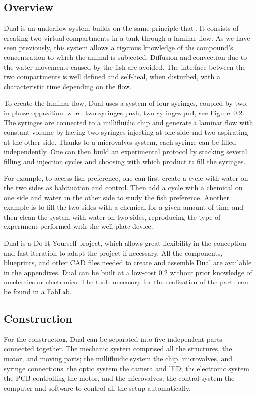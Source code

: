   \subsection{Overview}
  Dual is an underflow system builds on the same principle that \cite{readman2013fish}. It consists of creating two virtual compartments in a tank through a laminar flow. As we have seen previously, this system allows a rigorous knowledge of the compound's concentration to which the animal is subjected. Diffusion and convection due to the water movements caused by the fish are avoided. The interface between the two compartments is well defined and self-heal, when disturbed, with a characteristic time depending on the flow.

  To create the laminar flow, Dual uses a system of four syringes, coupled by two, in phase opposition, when two syringes push, two syringes pull, see Figure~\ref{}. The syringes are connected to a millifluidic chip and generate a laminar flow with constant volume by having two syringes injecting at one side and two aspirating at the other side. Thanks to a microvalves system, each syringe can be filled independently. One can then build an experimental protocol by stacking several filling and injection cycles and choosing with which product to fill the syringes.

  For example, to access fish preference, one can first create a cycle with water on the two sides as habituation and control. Then add a cycle with a chemical on one side and water on the other side to study the fish preference. Another example is to fill the two sides with a chemical for a given amount of time and then clean the system with water on two sides, reproducing the type of experiment performed with the well-plate device.

  Dual is a Do It Yourself project, which allows great flexibility in the conception and fast iteration to adapt the project if necessary. All the components, blueprints, and other CAD files needed to create and assemble Dual are available in the appendixes. Dual can be built at a low-cost \ref{} without prior knowledge of mechanics or electronics. The tools necessary for the realization of the parts can be found in a FabLab.

\subsection{Construction}
For the construction, Dual can be separated into five independent parts connected together. The mechanic system comprised all the structures, the motor, and moving parts; the millifluidic system the chip, microvalves, and syringe connections; the optic system the camera and lED; the electronic system the PCB controlling the motor, and the microvalves; the control system the computer and software to control all the setup automatically.


